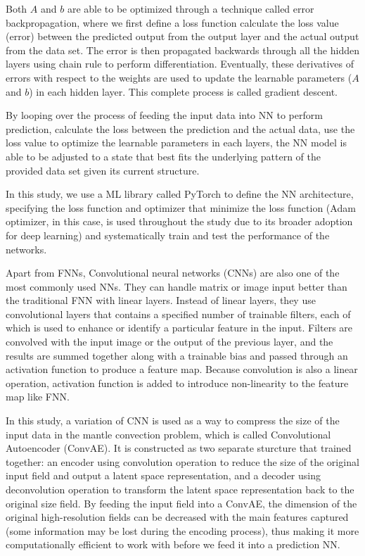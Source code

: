 Both $A$ and $b$ are able to be optimized through a technique called error backpropagation, where we first define a loss function calculate the loss value (error) between the predicted output from the output layer and the actual output from the data set. The error is then propagated backwards through all the hidden layers using chain rule to perform differentiation. Eventually, these derivatives of errors with respect to the weights are used to update the learnable parameters ($A$ and $b$) in each hidden layer. This complete process is called gradient descent. 

By looping over the process of feeding the input data into NN to perform prediction, calculate the loss between the prediction and the actual data, use the loss value to optimize the learnable parameters in each layers, the NN model is able to be adjusted to a state that best fits the underlying pattern of the provided data set given its current structure.

In this study, we use a ML library called PyTorch to define the NN architecture, specifying the loss function and optimizer that minimize the loss function (Adam optimizer, in this case, is used throughout the study due to its broader adoption for deep learning) and systematically train and test the performance of the networks.

Apart from FNNs, Convolutional neural networks (CNNs) are also one of the most commonly used NNs. They can handle matrix or image input better than the traditional FNN with linear layers. Instead of linear layers, they use convolutional layers that contains a specified number of trainable filters, each of which is used to enhance or identify a particular feature in the input. Filters are convolved with the input image or the output of the previous layer, and the results are summed together along with a trainable bias and passed through an activation function to produce a feature map. Because convolution is also a linear operation, activation function is added to introduce non-linearity to the feature map like FNN.

In this study, a variation of CNN is used as a way to compress the size of the input data in the mantle convection problem, which is called Convolutional Autoencoder (ConvAE). It is constructed as two separate sturcture that trained together: an encoder using convolution operation to reduce the size of the original input field and output a latent space representation, and a decoder using deconvolution operation to transform the latent space representation back to the original size field. By feeding the input field into a ConvAE, the dimension of the original high-resolution fields can be decreased with the main features captured (some information may be lost during the encoding process), thus making it more computationally efficient to work with before we feed it into a prediction NN.

